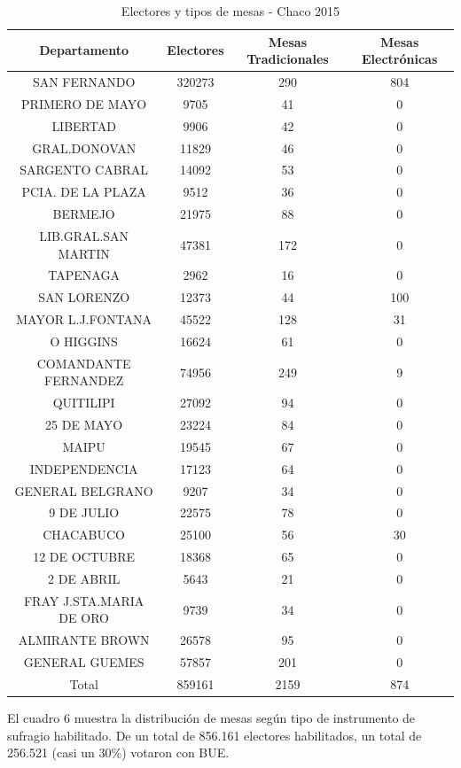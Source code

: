 \documentclass[12pt,a4paper]{article}
\begin{document}
\renewcommand{\arraystretch}{1.25}
\begin{table}[h!]
\centering
\begin{tabular}{c c c c} 
 Departamento & Electores & Mesas Tradicionales & Mesas Electrónicas \\ [0.5ex] 
 \hline
SAN FERNANDO & 320273 & 290 & 804 \\
PRIMERO DE MAYO &	9705 & 41 & 0 \\
LIBERTAD & 9906 & 42 & 0 \\
GRAL.DONOVAN & 11829 & 46 & 0 \\
SARGENTO CABRAL &	14092 & 53 & 0 \\
PCIA. DE LA PLAZA &	9512 & 36 & 0 \\
BERMEJO	& 21975 & 88 & 0 \\
LIB.GRAL.SAN MARTIN	& 47381 & 172 & 0 \\
TAPENAGA & 2962 & 16 & 0 \\
SAN LORENZO &	12373 & 44 & 100 \\
MAYOR L.J.FONTANA &	45522 & 128 & 31 \\
O HIGGINS	& 16624 & 61 & 0 \\
COMANDANTE FERNANDEZ & 74956 & 249 & 9 \\
QUITILIPI	& 27092 & 94 & 0 \\
25 DE MAYO & 23224 & 84 & 0 \\
MAIPU & 19545 & 67 & 0 \\
INDEPENDENCIA	& 17123 & 64 & 0 \\
GENERAL BELGRANO & 9207 & 34 & 0 \\
9 DE JULIO & 22575 & 78 & 0 \\
CHACABUCO	& 25100 & 56 & 30 \\
12 DE OCTUBRE &	18368 & 65 & 0 \\
2 DE ABRIL & 5643 & 21 & 0 \\
FRAY J.STA.MARIA DE ORO	& 9739 & 34 & 0 \\
ALMIRANTE BROWN	& 26578 & 95 & 0 \\
GENERAL GUEMES & 57857 & 201 & 0 \\ 
 \hline
Total & 859161 & 2159 & 874 \\ [1ex]
 \hline
\end{tabular}
\caption{Electores y tipos de mesas - Chaco 2015}
\label{table:1}
\end{table}

El cuadro 6 muestra la distribución de mesas según tipo de instrumento de
sufragio habilitado. De un total de 856.161 electores habilitados, un total de
256.521 (casi un 30\%) votaron con BUE.
\end{document}
